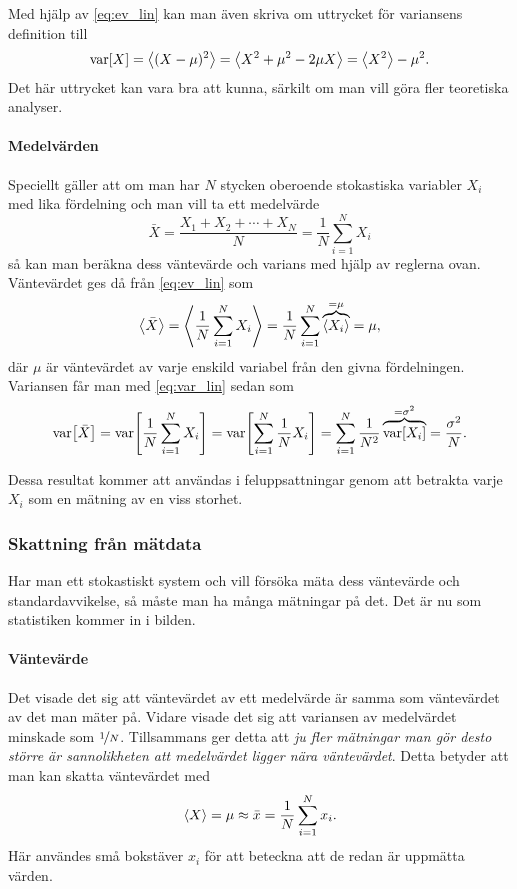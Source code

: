 \documentclass[11pt,a4paper, swedish
]{article}
\newcommand{\VAR}[1]{\ensuremath\text{var}\!\left[#1\right]}
\begin{document}
Med hjälp av \eqref{eq:ev_lin} kan man även skriva om uttrycket för
variansens definition till
\begin{equation}
\VAR{X} =\ev{(X-\mu)^2}
= \ev{X^2+\mu^2-2\mu X}
= \ev{X^2} - \mu^2.
\end{equation}
Det här uttrycket kan vara bra att kunna, särkilt om man vill göra
fler teoretiska analyser. 

\paragraph{Medelvärden}
Speciellt gäller att om man har $N$ stycken oberoende stokastiska variabler
$X_i$ med lika fördelning och man vill ta ett medelvärde 
\begin{equation} 
\bar{X} = \frac{X_1+X_2+\cdots+X_N}{N} = \frac{1}{N}\sum_{i=1}^N X_i
\end{equation}
så kan man beräkna dess väntevärde och varians med hjälp av reglerna
ovan. 
Väntevärdet ges då från \eqref{eq:ev_lin} som
\begin{equation}\label{eq:ev_mean}
\ev{\bar{X}} = \ev{\frac{1}{N} \sum_{i=1}^N X_i} 
= \frac{1}{N} \sum_{i=1}^N \overbrace{\ev{X_i}}^{=\mu} 
= \mu,
\end{equation}
där $\mu$ är väntevärdet av varje enskild variabel från den givna
fördelningen. 
Variansen får man med \eqref{eq:var_lin} sedan som
\begin{equation}\label{eq:var_mean}
\VAR{\bar{X}} = \VAR{\frac{1}{N} \sum_{i=1}^N X_i}
= \VAR{\sum_{i=1}^N \frac{1}{N} X_i}
= \sum_{i=1}^N \frac{1}{N^2}\overbrace{\VAR{X_i}}^{=\sigma^2}
= \frac{\sigma^2}{N}.
\end{equation}

Dessa resultat kommer att användas i feluppsattningar genom att
betrakta varje $X_i$ som en mätning av en viss storhet.


\subsubsection{Skattning från mätdata}
Har man ett stokastiskt system och vill försöka mäta dess väntevärde
och standardavvikelse, så måste man ha många mätningar på det. Det är
nu som statistiken kommer in i bilden.

\paragraph{Väntevärde}
Det visade det sig att väntevärdet av ett medelvärde är samma som
väntevärdet av det man mäter på. Vidare visade det sig att variansen
av medelvärdet minskade som $\nicefrac{1}{N}$. Tillsammans ger detta
att \emph{ju fler mätningar man gör desto större är sannolikheten att
  medelvärdet ligger nära väntevärdet}.  
Detta betyder att man kan skatta väntevärdet med
\begin{equation}\label{eq:ev_approx}
\ev{X} = \mu \approx \bar{x} = \frac{1}{N}\sum_{i=1}^N x_i.
\end{equation}
Här användes små bokstäver $x_i$ för att beteckna att de redan är
uppmätta värden.
\end{document}

